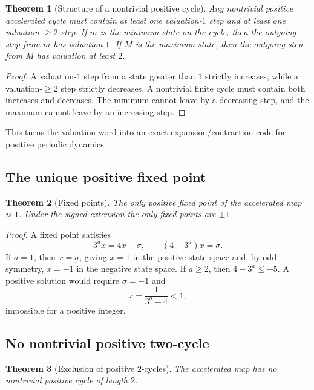 \documentclass[11pt]{article}
\newtheorem{theorem}{Theorem}[section]
\theoremstyle{definition}
\theoremstyle{remark}
\begin{document}
\begin{theorem}[Structure of a nontrivial positive cycle]
Any nontrivial positive accelerated cycle must contain at least one valuation-$1$ step and at least one valuation-$\ge2$ step.  If $m$ is the minimum state on the cycle, then the outgoing step from $m$ has valuation $1$.  If $M$ is the maximum state, then the outgoing step from $M$ has valuation at least $2$.
\end{theorem}

\begin{proof}
A valuation-$1$ step from a state greater than $1$ strictly increases, while a valuation-$\ge2$ step strictly decreases.  A nontrivial finite cycle must contain both increases and decreases.  The minimum cannot leave by a decreasing step, and the maximum cannot leave by an increasing step.
\end{proof}

This turns the valuation word into an exact expansion/contraction code for positive periodic dynamics.

\subsection{The unique positive fixed point}

\begin{theorem}[Fixed points]
The only positive fixed point of the accelerated map is $1$.  Under the signed extension the only fixed points are $\pm1$.
\end{theorem}

\begin{proof}
A fixed point satisfies
\[
3^a x=4x-\sigma,
\qquad
(4-3^a)x=\sigma.
\]
If $a=1$, then $x=\sigma$, giving $x=1$ in the positive state space and, by odd symmetry, $x=-1$ in the negative state space.  If $a\ge2$, then $4-3^a\le-5$.  A positive solution would require $\sigma=-1$ and
\[
x=\frac1{3^a-4}<1,
\]
impossible for a positive integer.
\end{proof}

\subsection{No nontrivial positive two-cycle}

\begin{theorem}[Exclusion of positive $2$-cycles]
The accelerated map has no nontrivial positive cycle of length $2$.
\end{theorem}
\end{document}
